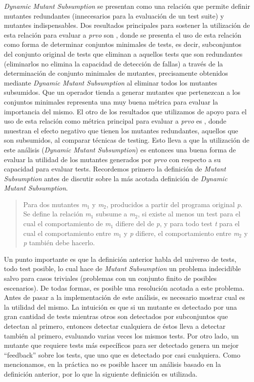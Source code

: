 \emph{Dynamic Mutant Subsumption} se presentan como una relaci\'on que permite definir mutantes redundantes (innecesarios para la evaluaci\'on de un test suite) y mutantes indispensables. Dos resultados principales para sostener la utilizaci\'on de esta relaci\'on para evaluar a \emph{prvo} son \cite{bibliography.mutation.minimizing.dynamicsubsumption}, donde se presenta el uso de esta relaci\'on como forma de determinar conjuntos minimales de tests, es decir, subconjuntos del conjunto original de tests que eliminan a aquellos tests que son redundantes (eliminarlos no elimina la capacidad de detecci\'on de fallas) a través de la determinaci\'on de conjunto minimales de mutantes, precisamente obtenidos mediante \emph{Dynamic Mutant Subsumption} al eliminar todos los mutantes subsumidos. Que un operador tienda a generar mutantes que pertenezcan a los conjuntos minimales representa una muy buena m\'etrica para evaluar la importancia del mismo. El otro de los resultados que utilizamos de apoyo para el uso de esta relaci\'on como m\'etrica principal para evaluar a \emph{prvo} es \cite{bibliography.mutation.evaluation.PapadakisHHJT16}, donde muestran el efecto negativo que tienen los mutantes redundantes, aquellos que son subsumidos, al comparar t\'ecnicas de testing. Esto lleva a que la utilizaci\'on de este an\'alisis (\emph{Dynamic Mutant Subsumption}) es entonces una buena forma de evaluar la utilidad de los mutantes generados por \emph{prvo} con respecto a su capacidad para evaluar tests.
Recordemos primero la definici\'on de \emph{Mutant Subsumption} antes de discutir sobre la m\'as acotada definici\'on de \emph{Dynamic Mutant Subsumption}.
\begin{quote}
	Para dos mutantes \emph{m$_1$} y \emph{m$_2$}, producidos a partir del programa original \emph{p}. Se define la relaci\'on \emph{m$_1$} subsume a \emph{m$_2$}, si existe al menos un test para el cual el comportamiento de \emph{m$_1$} difiere del de \emph{p}, y para todo test \emph{t} para el cual el comportamiento entre \emph{m$_1$} y \emph{p} difiere, el comportamiento entre \emph{m$_2$} y \emph{p} tambi\'en debe hacerlo.
\end{quote}
Un punto importante es que la definici\'on anterior habla del universo de tests, todo test posible, lo cual hace de \emph{Mutant Subsumption} un problema indecidible salvo para casos triviales (problemas con un conjunto finito de posibles escenarios). De todas formas, es posible una resoluci\'on acotada a este problema. Antes de pasar a la implementaci\'on de este an\'alisis, es necesario mostrar cual es la utilidad del mismo. La intuici\'on es que si un mutante es detectado por una gran cantidad de tests mientras otros son detectados por subconjuntos que detectan al primero, entonces detectar cualquiera de \'estos lleva a detectar tambi\'en al primero, evaluando varias veces los mismos tests. Por otro lado, un mutante que requiere tests m\'as espec\'ificos para ser detectado genera un mejor ``feedback'' sobre los tests, que uno que es detectado por casi cualquiera. Como mencionamos, en la pr\'actica no es posible hacer un an\'alisis basado en la definici\'on anterior, por lo que la siguiente definici\'on es utilizada.
